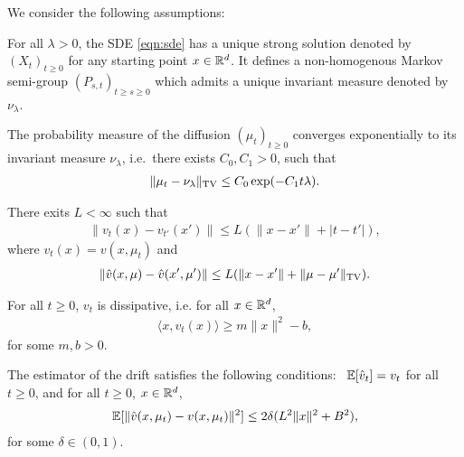 \newcommand{\minvsp}{0}

We consider the following assumptions: \vspace{\minvsp pt}
\begin{assumption}
\label{asmp:sde_ergo}
For all $\lambda >0$, the SDE  \eqref{eqn:sde} has a unique strong solution denoted by $(X_t)_{t\geq 0}$ for any starting point $x \in \mathbb{R}^d$. It defines a non-homogenous Markov semi-group $(P_{s,t})_{t\geq s\geq 0}$ which admits a unique invariant measure denoted by $\nu_\lambda$. 
\vspace{\minvsp pt}
\end{assumption}
%
\begin{assumption}
\label{asmp:sde_expconv}
The probability measure of the diffusion $(\mu_t)_{t\geq 0}$ converges exponentially to its invariant measure $\nu_\lambda$, i.e.\ there exists $C_0, C_1 >0$, such that
\begin{align}
\|\mu_t - \nu_\lambda \|_{\textnormal{TV}} \leq C_0 \exp(-C_1 t \lambda).
\end{align}
\vspace{\minvsp pt}
\end{assumption}
%
\begin{assumption}
\label{asmp:lipschitz}
There exits $L < \infty$ such that
\begin{align}
\| v_t(x) - v_{t'}(x') \| \leq L ( \|x-x' \| + |t-t'|),
\end{align}
where $v_t(x) = v(x,\mu_t)$ and
\begin{align}
\| \hat{v}(x,\mu) - \hat{v}(x',\mu') \| \leq L ( \|x-x' \| + \|\mu-\mu'\|_{\textnormal{TV}}).
\end{align}
\vspace{\minvsp pt}
\end{assumption}
%
\begin{assumption}
\label{asmp:dissip}
For all $t \geq 0$, $v_t$ is dissipative, i.e. for all $x \in \mathbb{R}^d$,
\begin{align}
\langle x, v_t(x) \rangle \geq m \|x\|^2 -b,
\end{align}
for some $m,b >0$.
\vspace{\minvsp pt}
\end{assumption}
%
\begin{assumption}
\label{asmp:stochgrad}
The estimator of the drift satisfies the following conditions: \ $\mathbb{E}[\hat{v}_t] = v_t$ for all $t \geq 0$, and for all $t\geq 0$, $x \in \mathbb{R}^d$,
\begin{align}
\mathbb{E}[ \|\hat{v}(x,\mu_t) - v(x,\mu_t) \|^2] \leq 2 \delta(L^2 \|x\|^2 + B^2),
\end{align}
for some $\delta \in (0,1)$. %
\vspace{\minvsp pt}
\end{assumption}
